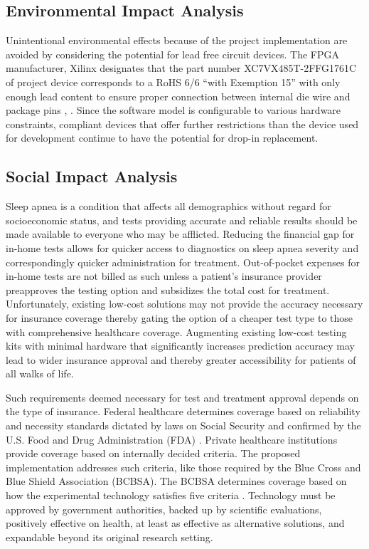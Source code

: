 \documentclass[12pt,titlepage]{article}
\begin{document}
\subsection{Environmental Impact Analysis}
Unintentional environmental effects because of the project implementation are avoided by considering the potential for lead free circuit
devices. The FPGA manufacturer, Xilinx designates that the part number XC7VX485T-2FFG1761C of project device corresponds to a RoHS 6/6
“with Exemption 15” with only enough lead content to ensure proper connection between internal die wire and package pins \cite{xilinx},
\cite{menon}.  Since the software model is configurable to various hardware constraints, compliant devices that offer further restrictions
than the device used for development continue to have the potential for drop-in replacement. 

\subsection{Social Impact Analysis}
Sleep apnea is a condition that affects all demographics without regard for socioeconomic status, and tests providing accurate and reliable
results should be made available to everyone who may be afflicted. Reducing the financial gap for in-home tests allows for quicker access
to diagnostics on sleep apnea severity and correspondingly quicker administration for treatment. Out-of-pocket expenses for in-home tests
are not billed as such unless a patient’s insurance provider preapproves the testing option and subsidizes the total cost for treatment.
Unfortunately, existing low-cost solutions may not provide the accuracy necessary for insurance coverage thereby gating the option of a
cheaper test type to those with comprehensive healthcare coverage. Augmenting existing low-cost testing kits with minimal hardware that
significantly increases prediction accuracy may lead to wider insurance approval and thereby greater accessibility for patients of all
walks of life. 

Such requirements deemed necessary for test and treatment approval depends on the type of insurance. Federal healthcare determines coverage
based on reliability and necessity standards dictated by laws on Social Security and confirmed by the U.S. Food and Drug Administration (FDA)
\cite{steinberg}. Private healthcare institutions provide coverage based on internally decided criteria. The proposed implementation addresses
such criteria, like those required by the Blue Cross and Blue Shield Association (BCBSA). The BCBSA determines coverage based on how the
experimental technology satisfies five criteria \cite{steinberg}. Technology must be approved by government authorities, backed up by scientific
evaluations, positively effective on health, at least as effective as alternative solutions, and expandable beyond its original research setting.
\end{document}
